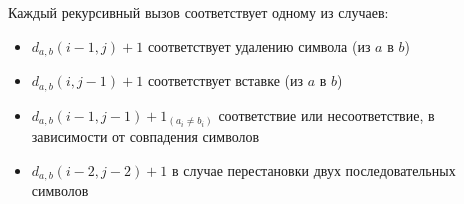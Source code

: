 Каждый рекурсивный вызов соответствует одному из случаев:

\begin{itemize}
    \setlength{\itemsep}{0em}
    \item $d_{a,b}(i-1,j) + 1$ соответствует удалению символа (из $a$ в $b$)
    \item $d_{a,b}(i,j-1) + 1$ соответствует вставке (из $a$ в $b$)
    \item $d_{a,b}(i-1,j-1) + 1_{(a_i \ne b_i)}$ соответствие или несоответствие, в зависимости от совпадения символов
    \item $d_{a,b}(i-2,j-2) + 1$ в случае перестановки двух последовательных символов
\end{itemize}

